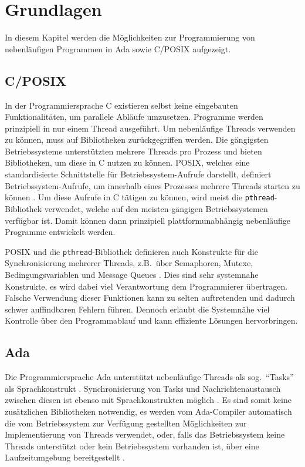 \documentclass[oneside]{elaboration}
\begin{document}
\chapter{Grundlagen}
\label{chp:grundlagen}

In diesem Kapitel werden die Möglichkeiten zur Programmierung von nebenläufigen
Programmen in Ada sowie C/POSIX aufgezeigt.

\section{C/POSIX}
\label{sec:c/posix}

In der Programmiersprache C existieren selbst keine eingebauten
Funktionalitäten, um parallele Abläufe umzusetzen. Programme werden prinzipiell
in nur einem Thread ausgeführt. Um nebenläufige Threads verwenden zu können,
muss auf Bibliotheken zurückgegriffen werden. Die gängigsten Betriebssysteme
unterstützten mehrere Threads pro Prozess und bieten Bibliotheken, um diese in C
nutzen zu können. POSIX, welches eine standardisierte Schnittstelle für
Betriebssystem-Aufrufe darstellt, definiert Betriebssystem-Aufrufe, um innerhalb
eines Prozesses mehrere Threads starten zu können \citep[vgl.][]{Pthread}. Um diese Aufrufe in C tätigen
zu können, wird meist die \texttt{pthread}-Bibliothek verwendet, welche auf
den meisten gängigen Betriebssystemen verfügbar ist. Damit können dann prinzipiell
plattformunabhängig nebenläufige Programme entwickelt werden.

POSIX und die \texttt{pthread}-Bibliothek definieren auch Konstrukte für die
Synchronisierung mehrerer Threads, z.B.\ über Semaphoren, Mutexe,
Bedingungsvariablen und Message Queues \citep[vgl.][]{Pthread}. Dies sind sehr
systemnahe Konstrukte, es wird dabei viel Verantwortung dem Programmierer
übertragen. Falsche Verwendung dieser Funktionen kann zu selten auftretenden und
dadurch schwer auffindbaren Fehlern führen. Dennoch erlaubt die Systemnähe viel
Kontrolle über den Programmablauf und kann effiziente Lösungen hervorbringen.

\section{Ada}
\label{sec:ada}

Die Programmiersprache Ada unterstützt nebenläufige Threads als sog.\
\enquote{Tasks} als Sprachkonstrukt \citep[vgl.][]{AdaTasks}. Synchronisierung
von Tasks und Nachrichtenaustausch zwischen diesen ist ebenso mit
Sprachkonstrukten möglich \citep[vgl.][]{AdaIntertaskComm,AdaPO}. Es sind somit
keine zusätzlichen Bibliotheken notwendig, es werden vom Ada-Compiler
automatisch die vom Betriebssystem zur Verfügung gestellten Möglichkeiten zur
Implementierung von Threads verwendet, oder, falls das Betriebssystem keine
Threads unterstützt oder kein Betriebssystem vorhanden ist, über eine
Laufzeitumgebung bereitgestellt \citep[vgl.][]{AdaTaskImpl}.
\end{document}
